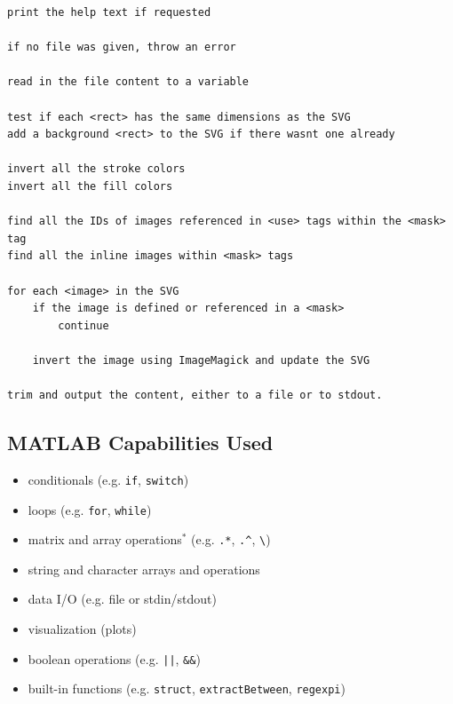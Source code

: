 \documentclass[12pt]{article}
\begin{document}
\begin{verbatim}
print the help text if requested

if no file was given, throw an error

read in the file content to a variable

test if each <rect> has the same dimensions as the SVG
add a background <rect> to the SVG if there wasnt one already

invert all the stroke colors
invert all the fill colors

find all the IDs of images referenced in <use> tags within the <mask> tag
find all the inline images within <mask> tags

for each <image> in the SVG
    if the image is defined or referenced in a <mask>
        continue

    invert the image using ImageMagick and update the SVG

trim and output the content, either to a file or to stdout.
\end{verbatim}

\subsection{MATLAB Capabilities Used}

\begin{itemize}[label={}]
	\item \checkedBox conditionals (e.g. \textcolor{keyword}{\texttt{if}}, \textcolor{keyword}{\texttt{switch}})
	\item \checkedBox loops (e.g. \textcolor{keyword}{\texttt{for}}, \textcolor{keyword}{\texttt{while}})
	\item \checkedBox matrix and array operations$^*$ (e.g. \textcolor{operator}{\texttt{.*}}, \textcolor{operator}{\texttt{.\^{}}}, \textcolor{operator}{\texttt\textbackslash})
	\item \checkedBox string and character arrays and operations
	\item \checkedBox data I/O (e.g. file or stdin/stdout)
	\item \unchckdBox visualization (plots)
	\item \checkedBox boolean operations (e.g. \textcolor{operator}{\texttt{||}}, \textcolor{operator}{\texttt{\&\&}})
	\item \checkedBox built-in functions (e.g. \textcolor{function}{\texttt{struct}}, \textcolor{function}{\texttt{extractBetween}}, \textcolor{function}{\texttt{regexpi}})
\end{itemize}
\end{document}
